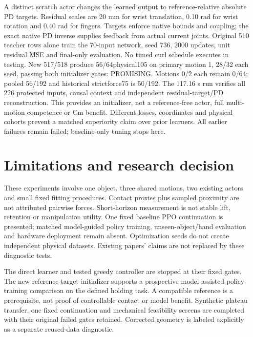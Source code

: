 \documentclass[10 pt]{article}
\begin{document}
A distinct scratch actor changes the learned output to reference-relative absolute
PD targets. Residual scales are 20 mm for wrist translation, 0.10 rad for wrist
rotation and 0.40 rad for fingers. Targets enforce native bounds and coupling;
the exact native PD inverse supplies feedback from actual current joints.
Original 510 teacher rows alone train the 70-input network, seed 736, 2000 updates,
unit residual MSE and final-only evaluation. No timed curl schedule executes
in testing. New 517/518 produce 56/64physical105 on primary motion 1, 28/32 each seed,
passing both initializer gates: PROMISING. Motions 0/2 each remain 0/64;
pooled 56/192 and historical strictforce75 is 50/192. The 117.16 s run verifies all 226
protected inputs, causal context and independent residual-target/PD reconstruction.
This provides an initializer, not a reference-free actor, full multi-motion
competence or Cm benefit. Different losses, coordinates and physical cohorts
prevent a matched superiority claim over prior learners. All earlier failures
remain failed; baseline-only tuning stops here.

\begin{table}[h]
\centering

\caption{Independent learned-policy evaluations: physical105 is the new prospective primary and strictforce75 is a historical secondary. All variants retain all three motions. These are initializer Probes, without Cm or policy-training utility claims.}
\end{table}

\section{Limitations and research decision}
These experiments involve one object, three shared motions, two existing actors
and small fixed fitting procedures. Contact proxies plus sampled proximity are
not attributed pairwise forces. Short-horizon measurement is not stable lift,
retention or manipulation utility. One fixed baseline PPO continuation is presented; matched model-guided policy
training, unseen-object/hand evaluation and hardware deployment remain absent. Optimization seeds do not create independent
physical datasets. Existing papers' claims are not replaced by these diagnostic tests.

The direct learner and tested greedy controller are stopped at their fixed gates.
The new reference-target initializer supports a prospective model-assisted
policy-training comparison on the defined holding task. A compatible reference is a
prerequisite, not proof of controllable contact or model benefit. Synthetic plateau transfer, one fixed continuation and mechanical feasibility
screens are completed with their original failed gates retained. Corrected geometry
is labeled explicitly as a separate reused-data diagnostic.
\end{document}
